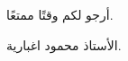 \documentclass[14pt]{extarticle}
\begin{document}
\begin{enumerate}[itemsep=2em]


\end{enumerate}

\vspace{1cm}
\begin{flushleft}
أرجو لكم وقتًا ممتعًا.

الأستاذ محمود اغبارية.
\end{flushleft}
\end{document}

